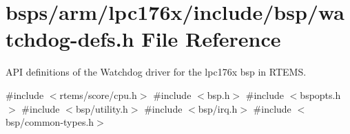 \hypertarget{watchdog-defs_8h}{}\section{bsps/arm/lpc176x/include/bsp/watchdog-\/defs.h File Reference}
\label{watchdog-defs_8h}


A\+PI definitions of the Watchdog driver for the lpc176x bsp in R\+T\+E\+MS.  


{\ttfamily \#include $<$rtems/score/cpu.\+h$>$}\newline
{\ttfamily \#include $<$bsp.\+h$>$}\newline
{\ttfamily \#include $<$bspopts.\+h$>$}\newline
{\ttfamily \#include $<$bsp/utility.\+h$>$}\newline
{\ttfamily \#include $<$bsp/irq.\+h$>$}\newline
{\ttfamily \#include $<$bsp/common-\/types.\+h$>$}\newline

